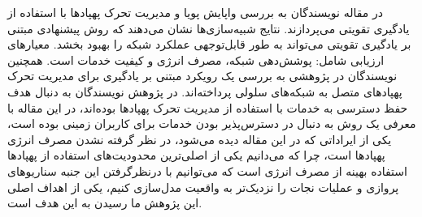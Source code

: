 در مقاله \cite{Meer2023} نویسندگان به بررسی واپایش پویا و مدیریت تحرک پهپادها با استفاده از یادگیری تقویتی می‌پردازند. نتایج شبیه‌سازی‌ها نشان می‌دهند که روش پیشنهادی مبتنی بر یادگیری تقویتی می‌تواند به طور قابل‌توجهی عملکرد شبکه را بهبود بخشد. معیارهای ارزیابی شامل: پوشش‌دهی شبکه، مصرف انرژی و کیفیت خدمات است. همچنین نویسندگان در پژوهشی \cite{Chowdhury2020} به بررسی یک رویکرد مبتنی بر یادگیری برای مدیریت تحرک پهپادهای متصل به شبکه‌های سلولی پرداخته‌اند.
در پژوهش \cite{10398469} نویسندگان به دنبال هدف حفظ دسترسی به خدمات با استفاده از مدیریت تحرک پهپادها بوده‌اند، در این مقاله با معرفی یک روش به دنبال در دسترس‌پذیر بودن خدمات برای کاربران زمینی بوده است، یکی از ایراداتی که در این مقاله دیده می‌شود، در نظر گرفته نشدن مصرف انرژی پهپادها است، چرا که می‌دانیم یکی از اصلی‌ترین محدودیت‌های استفاده از پهپادها استفاده بهینه از مصرف انرژی است که می‌توانیم با درنظرگرفتن این جنبه سناریوهای پروازی و عملیات نجات را نزدیک‌تر به واقعیت مدل‌سازی کنیم، یکی از اهداف اصلی این پژوهش ما رسیدن به این هدف است.

















